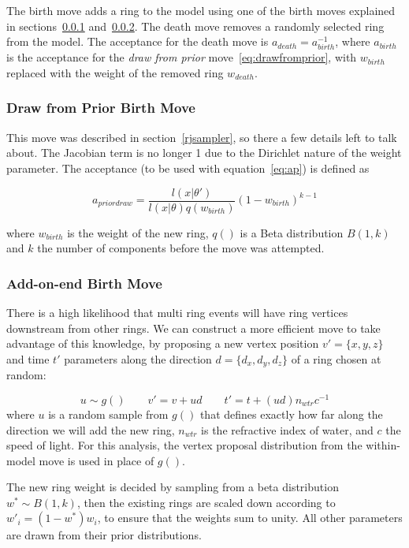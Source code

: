 \documentclass[11pt]{article} %
\begin{document}
The birth move adds a ring to the model using one of the birth moves explained in sections~\ref{drawfromprior} and~\ref{addonend}.
The death move removes a randomly selected ring from the model. The acceptance for the death move is $a_{death} = a_{birth}^{-1}$, where $a_{birth}$ is the acceptance for the \emph{draw from prior} move~\ref{eq:drawfromprior}, with $w_{birth}$ replaced with the weight of the removed ring $w_{death}$.

\subsubsection{Draw from Prior Birth Move}\label{drawfromprior}
This move was described in section~\ref{rjsampler}, so there a few details left to talk about. The Jacobian term is no longer 1 due to the Dirichlet nature of the weight parameter. The acceptance (to be used with equation~\ref{eq:ap}) is defined as

\begin{equation}\label{eq:drawfromprior}
a_{prior draw} = \frac{l(x|\theta')} {l(x|\theta)q(w_{birth})}(1-w_{birth})^{k-1}
\end{equation}

where $w_{birth}$ is the weight of the new ring, $q()$ is a Beta distribution $B(1,k)$ and $k$ the number of components before the move was attempted.

\subsubsection{Add-on-end Birth Move}\label{addonend}
There is a high likelihood that multi ring events will have ring vertices downstream from other rings. We can construct a more efficient move to take advantage of this knowledge, by proposing a new vertex position $v'=\{x,y,z\}$ and time $t'$ parameters along the direction $d=\{d_{x},d_{y},d_{z}\}$ of a ring chosen at random:

\begin{equation}
u\sim g() \qquad v' = v + ud\qquad t' = t + (ud)n_{wtr}c^{-1}
\end{equation}
where $u$ is a random sample from $g()$ that defines exactly how far along the direction we will add the new ring, $n_{wtr}$ is the refractive index of water, and $c$ the speed of light. For this analysis, the vertex proposal distribution from the within-model move is used in place of $g()$.

The new ring weight is decided by sampling from a beta distribution $w^{*}\sim B(1,k)$, then the existing rings are scaled down according to $w'_{i}=(1-w^{*})w_{i}$, to ensure that the weights sum to unity.
All other parameters are drawn from their prior distributions.
\end{document}
